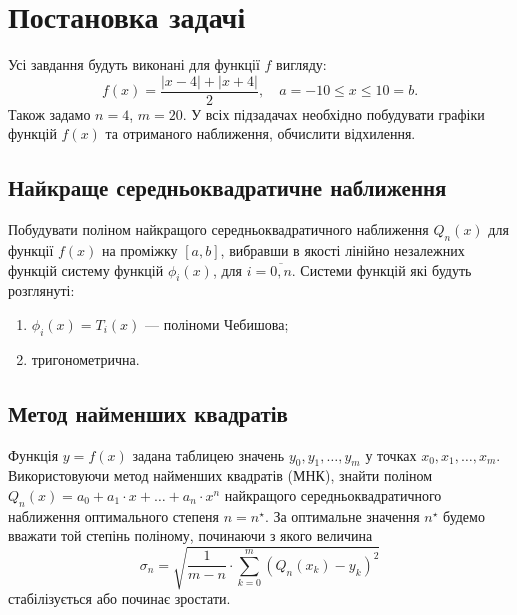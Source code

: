 




\tableofcontents

\section{Постановка задачі}

Усі завдання будуть виконані для функції $f$ вигляду: \[ f(x) = \frac{|x - 4| + |x + 4|}{2}, \quad a = -10 \le x \le 10 = b. \] Також задамо $n = 4$, $m = 20$. У всіх підзадачах необхідно побудувати графіки функцій $f(x)$ та отриманого наближення, обчислити відхилення.

\subsection{Найкраще середньоквадратичне наближення}

Побудувати поліном найкращого середньоквадратичного наближення $Q_n(x)$ для функції $f(x)$ на проміжку $[a, b]$, вибравши в якості лінійно незалежних функцій систему функцій $\phi_i(x)$, для $i=\overline{0,n}$. Системи функцій які будуть розглянуті:
\begin{enumerate}
    \item $\phi_i(x) = T_i(x)$ --- поліноми Чебишова;
    \item тригонометрична.
\end{enumerate}

\subsection{Метод найменших квадратів}

Функція $y = f(x)$ задана таблицею значень $y_0, y_1, \ldots, y_m$ у точках $x_0, x_1, \ldots, x_m$. Використовуючи метод найменших квадратів (МНК), знайти поліном $Q_n(x) = a_0 + a_1 \cdot x + \ldots + a_n \cdot x^n$ найкращого середньоквадратичного наближення оптимального степеня $n = n^\star$. За оптимальне значення $n^\star$ будемо вважати той степінь поліному, починаючи з якого величина \[ \sigma_n = \sqrt{\frac{1}{m - n} \cdot \sum_{k = 0}^m (Q_n(x_k) - y_k)^2} \] стабілізується або починає зростати.

